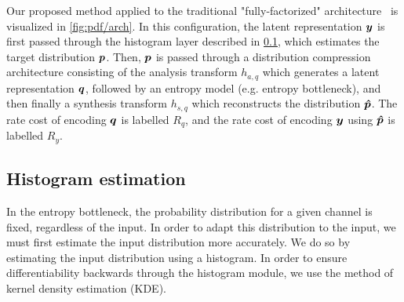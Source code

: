 Our proposed method applied to the traditional "fully-factorized" architecture~\cite{balle2018variational} is visualized in \cref{fig:pdf/arch}.
In this configuration, the latent representation ${\boldsymbol{y}}$ is first passed through the histogram layer described in \cref{sec:pdf_compression/histogram}, which estimates the target distribution ${\boldsymbol{p}}$.
Then, ${\boldsymbol{p}}$ is passed through a distribution compression architecture consisting of the analysis transform $h_{a,q}$ which generates
a latent representation ${\boldsymbol{q}}$, followed by an entropy model (e.g. entropy bottleneck), and then finally a synthesis transform $h_{s,q}$ which reconstructs the distribution ${\boldsymbol{\hat{p}}}$.
The rate cost of encoding ${\boldsymbol{q}}$ is labelled $R_{q}$, and the rate cost of encoding ${\boldsymbol{y}}$ using ${\boldsymbol{\hat{p}}}$ is labelled $R_{y}$.




\subsection{Histogram estimation}
\label{sec:pdf_compression/histogram}

In the entropy bottleneck, the probability distribution for a given channel is fixed, regardless of the input.
In order to adapt this distribution to the input, we must first estimate the input distribution more accurately.
We do so by estimating the input distribution using a histogram.
In order to ensure differentiability backwards through the histogram module, we use the method of kernel density estimation (KDE).


